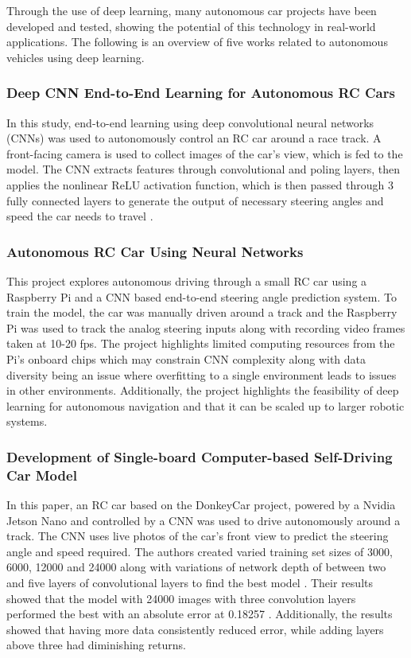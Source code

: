 \documentclass{article} %
\begin{document}
Through the use of deep learning, many autonomous car projects have been developed and tested, showing the potential of this technology in real-world applications. 
The following is an overview of five works related to autonomous vehicles using deep learning.  


\subsubsection{Deep CNN End-to-End Learning for Autonomous RC Cars \citep{bhutta2023deep}}

 
In this study, end-to-end learning using deep convolutional neural networks (CNNs) was used to autonomously control an RC car around a race track. 
A front-facing camera is used to collect images of the car’s view, which is fed to the model. The CNN extracts features through convolutional and poling layers, 
then applies the nonlinear ReLU activation function, which is then passed through 3 fully connected layers to generate the output of necessary steering angles 
and speed the car needs to travel \citep{bhutta2023deep}.

\subsubsection{Autonomous RC Car Using Neural Networks \citep{Mallik2023}}

This project explores autonomous driving through a small RC car using a Raspberry Pi and a CNN based end-to-end steering angle prediction system. 
To train the model, the car was manually driven around a track and the Raspberry Pi was used to track the analog steering inputs along with recording video frames 
taken at 10-20 fps. The project highlights limited computing resources from the Pi’s onboard chips which may constrain CNN complexity along with data 
diversity being an issue where overfitting to a single environment leads to issues in other environments. Additionally, the project highlights the 
feasibility of deep learning for autonomous navigation and that it can be scaled up to larger robotic systems.

\subsubsection{Development of Single-board Computer-based Self-Driving Car Model \citep{9751873}}

In this paper, an RC car based on the DonkeyCar project, powered by a Nvidia Jetson Nano and controlled by a CNN was used to drive autonomously around a track. The
CNN uses live photos of the car’s front view to predict the steering angle and speed required. The authors created varied training set sizes of 
3000, 6000, 12000 and 24000 along with variations of network depth of between two and five layers of convolutional layers to find the best model \citep{9751873}. 
Their results showed that the model with 24000 images with three convolution layers performed the best with an absolute error at 0.18257 \citep{9751873}. 
Additionally, the results showed that having more data consistently reduced error, while adding layers above three had diminishing returns. 
\end{document}
